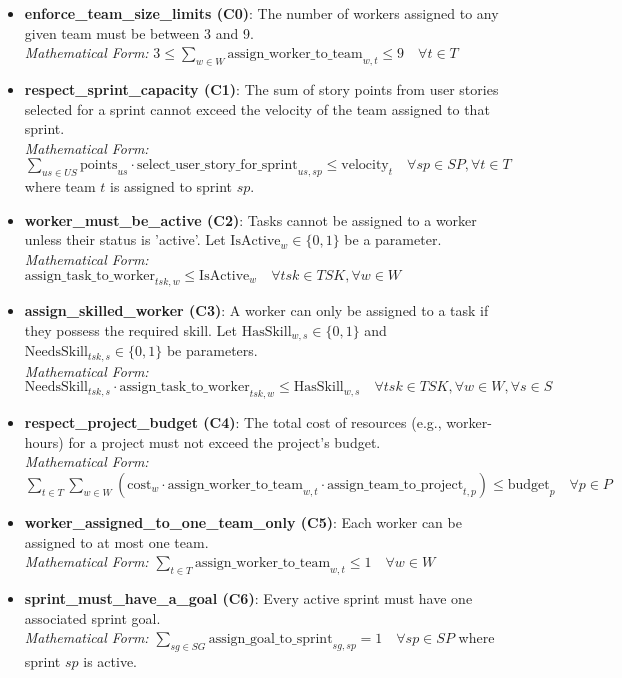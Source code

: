 \documentclass[11pt, a4paper]{article}
\begin{document}
\begin{itemize}
    \item \textbf{enforce\_team\_size\_limits (C0)}: The number of workers assigned to any given team must be between 3 and 9.
    \\ \textit{Mathematical Form:} $3 \le \sum_{w \in W} \text{assign\_worker\_to\_team}_{w,t} \le 9 \quad \forall t \in T$

    \item \textbf{respect\_sprint\_capacity (C1)}: The sum of story points from user stories selected for a sprint cannot exceed the velocity of the team assigned to that sprint.
    \\ \textit{Mathematical Form:} $\sum_{us \in US} \text{points}_{us} \cdot \text{select\_user\_story\_for\_sprint}_{us,sp} \le \text{velocity}_{t} \quad \forall sp \in SP, \forall t \in T$ where team $t$ is assigned to sprint $sp$.

    \item \textbf{worker\_must\_be\_active (C2)}: Tasks cannot be assigned to a worker unless their status is 'active'. Let $\text{IsActive}_w \in \{0,1\}$ be a parameter.
    \\ \textit{Mathematical Form:} $\text{assign\_task\_to\_worker}_{tsk,w} \le \text{IsActive}_w \quad \forall tsk \in TSK, \forall w \in W$

    \item \textbf{assign\_skilled\_worker (C3)}: A worker can only be assigned to a task if they possess the required skill. Let $\text{HasSkill}_{w,s} \in \{0,1\}$ and $\text{NeedsSkill}_{tsk,s} \in \{0,1\}$ be parameters.
    \\ \textit{Mathematical Form:} $\text{NeedsSkill}_{tsk,s} \cdot \text{assign\_task\_to\_worker}_{tsk,w} \le \text{HasSkill}_{w,s} \quad \forall tsk \in TSK, \forall w \in W, \forall s \in S$

    \item \textbf{respect\_project\_budget (C4)}: The total cost of resources (e.g., worker-hours) for a project must not exceed the project's budget.
    \\ \textit{Mathematical Form:} $\sum_{t \in T} \sum_{w \in W} (\text{cost}_w \cdot \text{assign\_worker\_to\_team}_{w,t} \cdot \text{assign\_team\_to\_project}_{t,p}) \le \text{budget}_p \quad \forall p \in P$

    \item \textbf{worker\_assigned\_to\_one\_team\_only (C5)}: Each worker can be assigned to at most one team.
    \\ \textit{Mathematical Form:} $\sum_{t \in T} \text{assign\_worker\_to\_team}_{w,t} \le 1 \quad \forall w \in W$

    \item \textbf{sprint\_must\_have\_a\_goal (C6)}: Every active sprint must have one associated sprint goal.
    \\ \textit{Mathematical Form:} $\sum_{sg \in SG} \text{assign\_goal\_to\_sprint}_{sg,sp} = 1 \quad \forall sp \in SP$ where sprint $sp$ is active.
\end{itemize}
\end{document}
